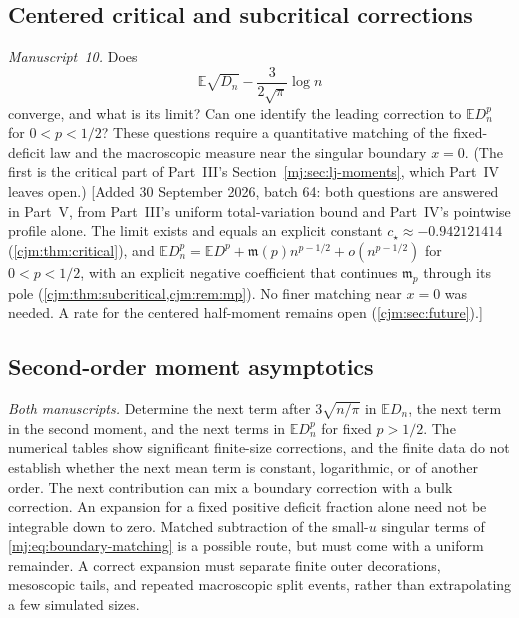 \documentclass[11pt,a4paper]{article}
\theoremstyle{definition}\newaliascnt{definition}{theorem}
\theoremstyle{remark}\newaliascnt{remark}{theorem}
\newcommand{\ljE}{\mathbb E}
\begin{document}
\subsection{Centered critical and subcritical corrections}
\label{mj:sec:q-centered}
\emph{Manuscript~10.} Does
\[
 \ljE\sqrt{D_n}-\frac3{2\sqrt\pi}\log n
\]
converge, and what is its limit? Can one identify the leading correction to
$\ljE D_n^p$ for $0<p<1/2$? These questions require a quantitative matching of
the fixed-deficit law and the macroscopic measure near the singular boundary
$x=0$. (The first is the critical part of Part~III's
Section~\ref{mj:sec:lj-moments}, which Part~IV leaves open.)
[Added 30 September 2026, batch 64: both questions are answered in Part~V,
from Part~III's uniform total-variation bound and Part~IV's pointwise
profile alone. The limit exists and equals an explicit constant
$c_\star\approx-0.942121414$ (\cref{cjm:thm:critical}), and
$\ljE D_n^p=\ljE D^p+\mathfrak m(p)n^{p-1/2}+o(n^{p-1/2})$ for $0<p<1/2$, with an
explicit negative coefficient that continues $\mathfrak m_p$ through its pole
(\cref{cjm:thm:subcritical,cjm:rem:mp}). No finer matching near $x=0$ was
needed. A rate for the centered half-moment remains open
(\cref{cjm:sec:future}).]

\subsection{Second-order moment asymptotics}
\label{cjm:sec:mj-second}
\emph{Both manuscripts.} Determine the next term after $3\sqrt{n/\pi}$ in
$\ljE D_n$, the next term in the second moment, and the next terms in
$\ljE D_n^p$ for fixed $p>1/2$. The numerical tables show significant
finite-size corrections, and the finite data do not establish whether the
next mean term is constant, logarithmic, or of another order. The next
contribution can mix a boundary correction with a bulk correction. An
expansion for a fixed positive deficit fraction alone need not be integrable
down to zero. Matched subtraction of the small-$u$ singular terms of
\eqref{mj:eq:boundary-matching} is a possible route, but must come with a
uniform remainder. A correct expansion must separate finite outer
decorations, mesoscopic tails, and repeated macroscopic split events, rather
than extrapolating a few simulated sizes.
\end{document}
